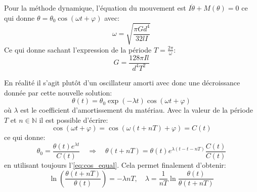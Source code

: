 Pour la méthode dynamique, l'équation du mouvement est $I\ddot{\theta} + M(\theta) = 0$ ce qui donne $\theta = \theta_0\cos(\omega t+ \varphi)$ avec:
\begin{equation}
    \omega = \sqrt{\frac{\pi G d^4}{32 l I}}
\end{equation}
Ce qui donne sachant l'expression de la période $T = \frac{2\pi}{\omega}$:
\begin{equation}
    G = \frac{128 \pi I l}{d^4 T^2}
    \label{eq:module_cisaillement_dynamique}
\end{equation}

En réalité il s'agit plutôt d'un oscillateur amorti avec donc une décroissance donnée par cette nouvelle solution:
\begin{equation}
    \theta(t) = \theta_0 \exp(-\lambda t) \cos(\omega t + \varphi)
\end{equation}
où $\lambda$ est le coefficient d'amortissement du matériau.
Avec la valeur de la période $T$ et $n \in \mathbb{N}$ il est possible d'écrire:
\begin{equation}
    \cos(\omega t + \varphi) = \cos(\omega (t + nT) + \varphi) = C(t)
    \label{eq:cos_equal}
\end{equation}
ce qui donne:
\begin{equation}
    \theta_0 = \frac{\theta(t) e^{\lambda t}}{C(t)}
    \quad \Rightarrow \quad
    \theta(t+nT) = \theta(t)e^{\lambda(t - t - nT)} \frac{C(t)}{C(t)}
\end{equation}
en utilisant toujours l'\autoref{eq:cos_equal}. Cela permet finalement d'obtenir:
\begin{equation}
    \ln\left(\frac{\theta(t+nT)}{\theta(t)}\right) = -\lambda nT , \quad
    \lambda = \frac{1}{nT} \ln \frac{\theta(t)}{\theta(t+nT)}
    \label{eq:decrement_log}
\end{equation}
